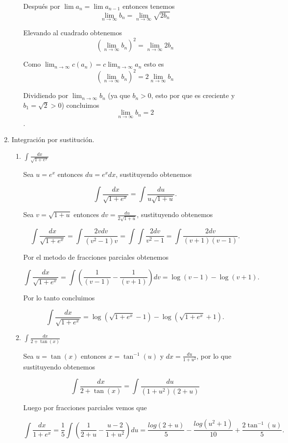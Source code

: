 \documentclass[letterpaper]{article}
\theoremstyle{definition}
\theoremstyle{lemathm}
\theoremstyle{lemademthm}
\begin{document}
\begin{enumerate}
\begin{enumerate}
				Después por $\lim a_n = \lim a_{n-1}$ entonces tenemos
				\[\lim_{n\to\infty} b_n = \lim_{n\to\infty} \sqrt{2b_n}\]
				
				Elevando al cuadrado obtenemos
				\[(\lim_{n\to\infty} b_n)^2 = \lim_{n\to\infty} 2b_n\]
				
				Como $\lim_{n\to\infty} c(a_n) = c \lim_{n\to\infty} a_n$ esto es
				\[(\lim_{n\to\infty} b_n)^2 = 2 \lim_{n\to\infty} b_n\]
				
				Dividiendo por $\lim_{n\to\infty} b_n$ (ya que $b_n > 0$, esto por que es creciente y $b_1 = \sqrt{2} > 0$) concluimos
				\[\lim_{n\to\infty} b_n = 2\].

		\end{enumerate}

		\item Integración por sustitución.
        
        \begin{enumerate}
            \item $\int \frac{dx}{\sqrt{1+e^x}}$
			
			Sea $u = e^x$ entonces $du = e^xdx$, sustituyendo obtenemos

			\[\int \frac{dx}{\sqrt{1+e^x}} = \int \frac{du}{u\sqrt{1+u}}.\]

			Sea $v = \sqrt{1+u}$ entonces $dv = \frac{du}{2\sqrt{1+u}}$, sustituyendo obtenemos

			\[\int \frac{dx}{\sqrt{1+e^x}} = \int \frac{2vdv}{(v^2-1)v} = \int \int \frac{2dv}{v^2-1} = \int \frac{2dv}{(v+1)(v-1)}.\]

			Por el metodo de fracciones parciales obtenemos

			\[\int \frac{dx}{\sqrt{1+e^x}} = \int \left(\frac{1}{(v-1)} - \frac{1}{(v+1)}\right)dv = \log(v-1) - \log(v+1).\]

			Por lo tanto concluimos

			\[\int \frac{dx}{\sqrt{1+e^x}} = \log(\sqrt{1+e^x}-1) - \log(\sqrt{1+e^x}+1).\]

            \item $\int \frac{dx}{2+\tan(x)}$
			
			Sea $u = \tan(x)$ entonces $x = \tan^{-1}(u)$ y $dx = \frac{du}{1+u^2}$, por lo que sustituyendo obtenemos

			\[\int \frac{dx}{2+\tan(x)} = \int \frac{du}{(1+u^2)(2+u)}\]

			Luego por fracciones parciales vemos que

			\[\int \frac{dx}{1+e^x} = \frac{1}{5}\int \left(\frac{1}{2+u} - \frac{u-2}{1+u^2}\right)du = \frac{log(2+u)}{5} - \frac{log(u^2+1)}{10} + \frac{2\tan^{-1}(u)}{5}.\]


\end{enumerate}
\end{enumerate}
\end{document}
